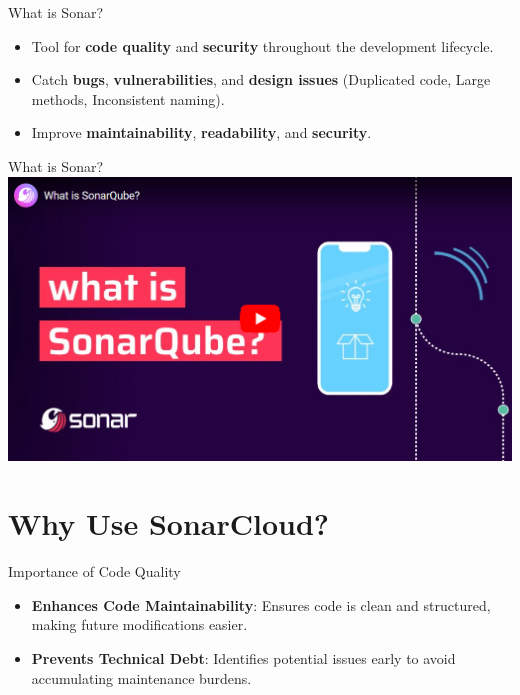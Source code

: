 \documentclass{beamer}
\begin{document}
\begin{frame}{What is Sonar?}
  \begin{itemize}
    \item Tool for \textbf{code quality} and \textbf{security} throughout the development lifecycle.
    \item Catch \textbf{bugs}, \textbf{vulnerabilities}, and \textbf{design issues} 
    (Duplicated code, Large methods, Inconsistent naming).
    \item Improve \textbf{maintainability}, \textbf{readability}, and \textbf{security}.
  \end{itemize}
\end{frame}

\begin{frame}{What is Sonar?}
  \href{https://youtu.be/xeTwG9XFFTE}{\includegraphics[scale=0.45]{fig/what_is_sonar_video.png}}
\end{frame}


\section[Why Use SonarCloud?]{Why Use SonarCloud?}

\begin{frame}{Importance of Code Quality}
  \begin{itemize}
    \item \textbf{Enhances Code Maintainability}: Ensures code is clean and structured, making future modifications easier.
    \vspace*{1em}
    \item \textbf{Prevents Technical Debt}: Identifies potential issues early to avoid accumulating maintenance burdens.
  \end{itemize}
\end{frame}
\end{document}
